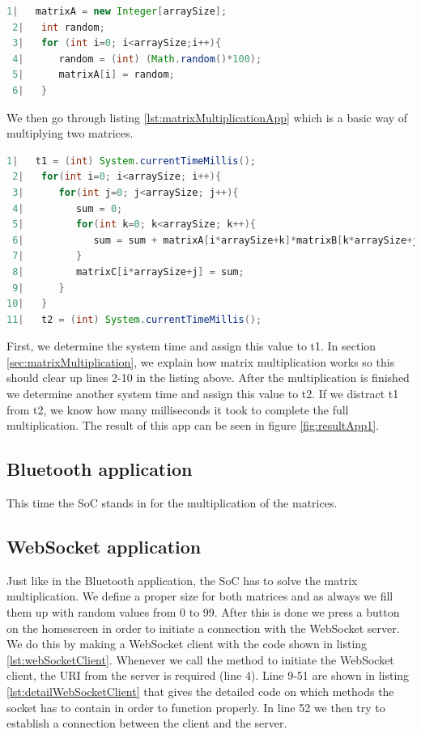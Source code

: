 \documentclass[a4paper, 11pt]{report}
\begin{document}
\begin{lstlisting}[caption={Creating matrix},captionpos=b, label={lst:createMatrix}, language=java, float=h]
 1|   matrixA = new Integer[arraySize];
 2|   int random;
 3|   for (int i=0; i<arraySize;i++){
 4|      random = (int) (Math.random()*100);
 5|      matrixA[i] = random;
 6|   }
\end{lstlisting}
We then go through listing \ref{lst:matrixMultiplicationApp} which is a basic way of multiplying two matrices.
\begin{lstlisting}[caption={Code for matrix multiplication on Android phone},captionpos=b, label={lst:matrixMultiplicationApp}, language=java, float=h]
 1|   t1 = (int) System.currentTimeMillis();
 2|   for(int i=0; i<arraySize; i++){
 3|      for(int j=0; j<arraySize; j++){
 4|         sum = 0;
 5|         for(int k=0; k<arraySize; k++){
 6|            sum = sum + matrixA[i*arraySize+k]*matrixB[k*arraySize+j];
 7|         }
 8|         matrixC[i*arraySize+j] = sum;
 9|      }
10|   }
11|   t2 = (int) System.currentTimeMillis();
\end{lstlisting}

First, we determine the system time and assign this value to t1. In section \ref{sec:matrixMultiplication}, we explain how matrix multiplication works so this should clear up lines 2-10 in the listing above. After the multiplication is finished we determine another system time and assign this value to t2. If we distract t1 from t2, we know how many milliseconds it took to complete the full multiplication. The result of this app can be seen in figure \ref{fig:resultApp1}.



	\subsection{Bluetooth application}
This time the SoC stands in for the multiplication of the matrices. 

	\subsection{WebSocket application}
Just like in the Bluetooth application, the SoC has to solve the matrix multiplication. We define a proper size for both matrices and as always we fill them up with random values from 0 to 99. After this is done we press a button on the homescreen in order to initiate a connection with the WebSocket server. We do this by making a WebSocket client with the code shown in listing \ref{lst:webSocketClient}. Whenever we call the method to initiate the WebSocket client, the URI from the server is required (line 4).  Line 9-51 are shown in listing \ref{lst:detailWebSocketClient} that gives the detailed code on which methods the socket has to contain in order to function properly. In line 52 we then try to establish a connection between the client and the server.
\end{document}
